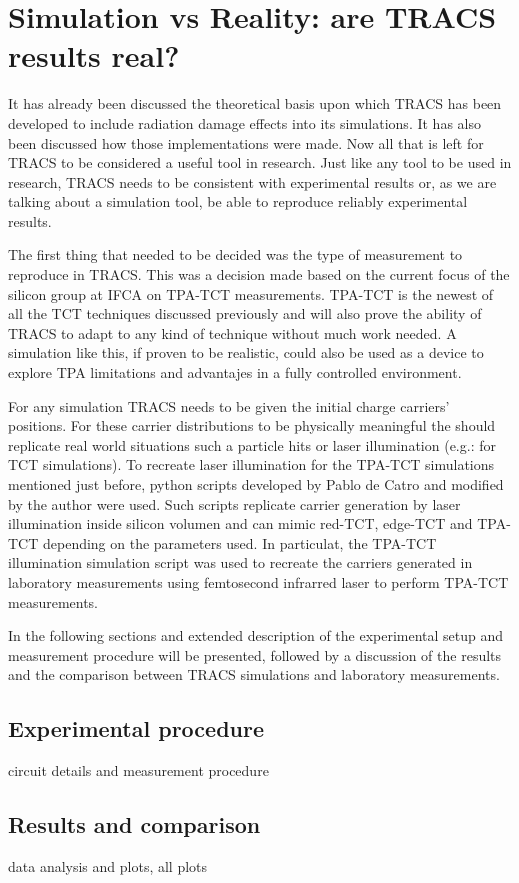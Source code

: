 \chapter{Simulation vs Reality: are TRACS results real?}

It has already been discussed the theoretical basis upon which TRACS has been developed to include radiation damage effects into its simulations. It has also been discussed how those implementations were made. Now all that is left for TRACS to be considered a useful tool in research. Just like any tool to be used in research, TRACS needs to be consistent with experimental results or, as we are talking about a simulation tool, be able to reproduce reliably experimental results.

The first thing that needed to be decided was the type of measurement to reproduce in TRACS. This was a decision made based on the current focus of the silicon group at IFCA \iffalse No se el nombre oficial \fi on TPA-TCT measurements. TPA-TCT is the newest  of all the TCT techniques discussed previously and will also prove the ability of TRACS to adapt to any kind of technique without much work needed. A simulation like this, if proven to be realistic, could also be used as a device to explore TPA limitations and advantajes in a fully controlled environment.

For any simulation TRACS needs to be given the initial charge carriers' positions. For these carrier distributions to be physically meaningful the should replicate real world situations such a particle hits or laser illumination (e.g.: for TCT simulations). To recreate laser illumination for the TPA-TCT simulations mentioned just before, python scripts developed by Pablo de Catro and modified by the author were used. Such scripts replicate carrier generation by laser illumination inside silicon volumen and can mimic red-TCT, edge-TCT and TPA-TCT depending on the parameters used. In particulat, the TPA-TCT illumination simulation script was used to recreate the carriers generated in laboratory measurements using femtosecond infrarred laser to perform TPA-TCT measurements.

In the following sections and extended description of the experimental setup and  measurement procedure will be presented, followed by a discussion of the results and the comparison between TRACS simulations and laboratory measurements.

\section{Experimental procedure} %
\label{sec:future_improvements}

circuit details and measurement procedure


\section{Results and comparison} %
\label{sec:future_proyection}

data analysis and plots, all plots 



